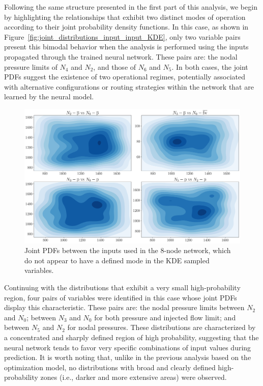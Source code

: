 Following the same structure presented in the first part of this analysis, we begin by highlighting the relationships that exhibit two distinct modes of operation according to their joint probability density functions. In this case, as shown in Figure~\cref{fig:joint_distributions_input_input_KDE}, only two variable pairs present this bimodal behavior when the analysis is performed using the inputs propagated through the trained neural network. These pairs are: the nodal pressure limits of $N_4$ and $N_2$, and those of $N_6$ and $N_5$. In both cases, the joint PDFs suggest the existence of two operational regimes, potentially associated with alternative configurations or routing strategies within the network that are learned by the neural model. 


\begin{figure}
    \begin{center}
        \includegraphics[width=.7\textwidth]{figures/Chapter_NonLinealCensnet/PDF_inputs_inputs_no_mode (KDE).png}
    \end{center}
    \caption{Joint PDFs between the inputs used in the 8-node network, which do not appear to have a defined mode in the KDE sampled variables. }
    \label{fig:joint_distributions_input_input_no_mode_KDE}
\end{figure}
 
Continuing with the distributions that exhibit a very small high-probability region, four pairs of variables were identified in this case whose joint PDFs display this characteristic. These pairs are: the nodal pressure limits between $N_2$ and $N_0$; between $N_3$ and $N_0$ for both pressure and injected flow limit; and between $N_5$ and $N_2$ for nodal pressures. These distributions are characterized by a concentrated and sharply defined region of high probability, suggesting that the neural network tends to favor very specific combinations of input values during prediction. It is worth noting that, unlike in the previous analysis based on the optimization model, no distributions with broad and clearly defined high-probability zones (i.e., darker and more extensive areas) were observed.


